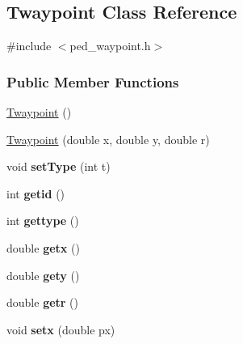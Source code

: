 \hypertarget{classTwaypoint}{
\subsection{Twaypoint Class Reference}
\label{classTwaypoint}
}


{\ttfamily \#include $<$ped\_\-waypoint.h$>$}

\subsubsection*{Public Member Functions}
\begin{DoxyCompactItemize}
\item 
\hyperlink{classTwaypoint_a7f7a62e48c656efe9b60d259486f081d}{Twaypoint} ()
\item 
\hyperlink{classTwaypoint_a5ab459e31fcc93716e0c889a6f416f29}{Twaypoint} (double x, double y, double r)
\item 
\hypertarget{classTwaypoint_aa7e06aeb48f6dd468c2f9dd7e2fb51d8}{
void {\bfseries setType} (int t)}
\label{classTwaypoint_aa7e06aeb48f6dd468c2f9dd7e2fb51d8}

\item 
\hypertarget{classTwaypoint_a1485a8a52ee193e3fa75f497182ec551}{
int {\bfseries getid} ()}
\label{classTwaypoint_a1485a8a52ee193e3fa75f497182ec551}

\item 
\hypertarget{classTwaypoint_ad6d9d25f57fb9f75c82ccaf2463ba916}{
int {\bfseries gettype} ()}
\label{classTwaypoint_ad6d9d25f57fb9f75c82ccaf2463ba916}

\item 
\hypertarget{classTwaypoint_a18e7eb097db09733efeb7ca2516ae582}{
double {\bfseries getx} ()}
\label{classTwaypoint_a18e7eb097db09733efeb7ca2516ae582}

\item 
\hypertarget{classTwaypoint_a831686557f770d7ce0e4aa083b53a687}{
double {\bfseries gety} ()}
\label{classTwaypoint_a831686557f770d7ce0e4aa083b53a687}

\item 
\hypertarget{classTwaypoint_a170b6a04c1d30e1ccfcf9afbd628a233}{
double {\bfseries getr} ()}
\label{classTwaypoint_a170b6a04c1d30e1ccfcf9afbd628a233}

\item 
\hypertarget{classTwaypoint_aae57d2602edf4cf23e359c77f100d682}{
void {\bfseries setx} (double px)}
\label{classTwaypoint_aae57d2602edf4cf23e359c77f100d682}


\end{DoxyCompactItemize}
